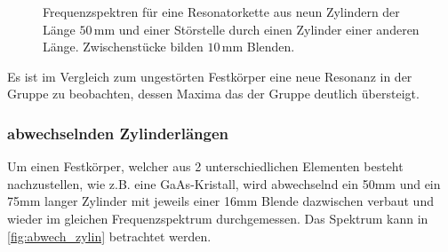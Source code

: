 \begin{figure}[H]
    \centering
    \hfil
    \hfil 
    \caption{Frequenzspektren für eine Resonatorkette aus neun Zylindern der Länge $50\,$mm und einer Störstelle durch einen Zylinder einer anderen Länge. Zwischenstücke bilden $10\,$mm Blenden.}
    \label{fig:fest_stoer}
\end{figure}

\noindent
Es ist im Vergleich zum ungestörten Festkörper eine neue Resonanz in der Gruppe zu beobachten, dessen Maxima das der Gruppe deutlich übersteigt.

\subsubsection{abwechselnden Zylinderlängen}
Um einen Festkörper, welcher aus 2 unterschiedlichen Elementen besteht nachzustellen, wie z.B. eine GaAs-Kristall, wird abwechselnd ein 50mm und ein 75mm langer Zylinder
mit jeweils einer 16mm Blende dazwischen verbaut und wieder im gleichen Frequenzspektrum durchgemessen. Das Spektrum kann in \autoref{fig:abwech_zylin} betrachtet werden.

